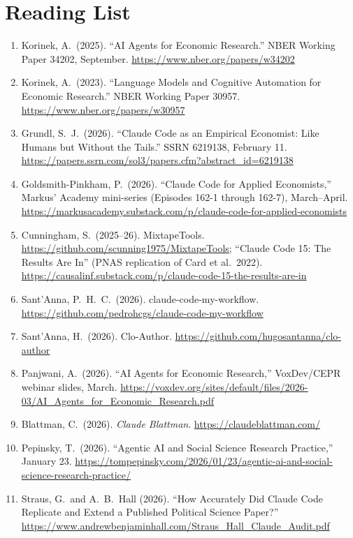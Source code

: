 \documentclass[11pt]{article}
\begin{document}
\section*{Reading List}
\begin{enumerate}[leftmargin=*,nosep]
    \item Korinek, A.\ (2025). ``AI Agents for Economic Research.'' NBER Working Paper 34202, September. \url{https://www.nber.org/papers/w34202}
    \item Korinek, A.\ (2023). ``Language Models and Cognitive Automation for Economic Research.'' NBER Working Paper 30957. \url{https://www.nber.org/papers/w30957}
    \item Grundl, S.\ J.\ (2026). ``Claude Code as an Empirical Economist: Like Humans but Without the Tails.'' SSRN 6219138, February 11. \url{https://papers.ssrn.com/sol3/papers.cfm?abstract_id=6219138}
    \item Goldsmith-Pinkham, P.\ (2026). ``Claude Code for Applied Economists,'' Markus' Academy mini-series (Episodes 162-1 through 162-7), March--April. \url{https://markusacademy.substack.com/p/claude-code-for-applied-economists}
    \item Cunningham, S.\ (2025--26). MixtapeTools. \url{https://github.com/scunning1975/MixtapeTools}; ``Claude Code 15: The Results Are In'' (PNAS replication of Card et al.\ 2022). \url{https://causalinf.substack.com/p/claude-code-15-the-results-are-in}
    \item Sant'Anna, P.\ H.\ C.\ (2026). claude-code-my-workflow. \url{https://github.com/pedrohcgs/claude-code-my-workflow}
    \item Sant'Anna, H.\ (2026). Clo-Author. \url{https://github.com/hugosantanna/clo-author}
    \item Panjwani, A.\ (2026). ``AI Agents for Economic Research,'' VoxDev/CEPR webinar slides, March. \url{https://voxdev.org/sites/default/files/2026-03/AI_Agents_for_Economic_Research.pdf}
    \item Blattman, C.\ (2026). \emph{Claude Blattman}. \url{https://claudeblattman.com/}
    \item Pepinsky, T.\ (2026). ``Agentic AI and Social Science Research Practice,'' January 23. \url{https://tompepinsky.com/2026/01/23/agentic-ai-and-social-science-research-practice/}
    \item Straus, G.\ and A.\ B.\ Hall (2026). ``How Accurately Did Claude Code Replicate and Extend a Published Political Science Paper?'' \url{https://www.andrewbenjaminhall.com/Straus_Hall_Claude_Audit.pdf}

\end{enumerate}
\end{document}

